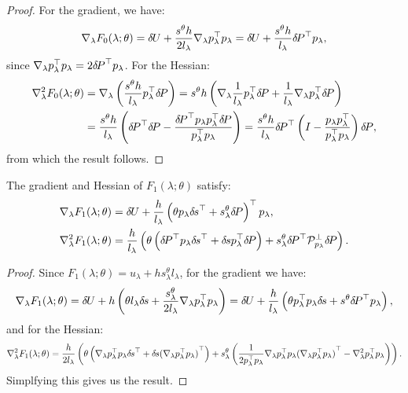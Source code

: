 \documentclass[eikonal.tex]{subfiles}
\begin{document}
\begin{proof}
  For the gradient, we have:
  \begin{equation*}
    \nabla_\lambda F_0(\lambda; \theta) = {\delta \hspace{-0.09em} U} + \frac{s^{\theta} h}{2 l_\lambda} \nabla_\lambda p_\lambda^\top p_\lambda = {\delta \hspace{-0.09em} U} + \frac{s^{\theta} h}{l_\lambda} {\delta \hspace{-0.14em} P}^\top p_\lambda,
  \end{equation*}
  since
  $\nabla_\lambda p_\lambda^\top p_\lambda = 2 {\delta \hspace{-0.14em} P}^\top
  p_\lambda$. For the Hessian:
  \begin{align*}
    \nabla^2_\lambda F_0(\lambda; \theta) &= \nabla_\lambda \left(\frac{s^{\theta} h}{l_\lambda} p_\lambda^\top {\delta \hspace{-0.14em} P}\right) = s^{\theta} h \left(\nabla_\lambda \frac{1}{l_\lambda} p_\lambda^\top {\delta \hspace{-0.14em} P} + \frac{1}{l_\lambda} \nabla_\lambda p_\lambda^\top {\delta \hspace{-0.14em} P}\right) \\
    &= \frac{s^{\theta} h}{l_\lambda} \left({\delta \hspace{-0.14em} P}^\top {\delta \hspace{-0.14em} P} - \frac{{\delta \hspace{-0.14em} P}^\top p_\lambda p_\lambda^\top {\delta \hspace{-0.14em} P}}{p_\lambda^\top p_\lambda}\right) = \frac{s^{\theta} h}{l_\lambda} {\delta \hspace{-0.14em} P}^\top \left(I - \frac{p_\lambda p_\lambda^\top}{p_\lambda^\top p_\lambda}\right) {\delta \hspace{-0.14em} P},
  \end{align*}
  from which the result follows.
\end{proof}

\begin{lemma}\label{prop:F1-grad-and-Hess}
  The gradient and Hessian of $F_1(\lambda; \theta)$ satisfy:
  \begin{align}
    \nabla_\lambda F_1(\lambda; \theta) &= {\delta \hspace{-0.09em} U} + \frac{h}{l_\lambda} \left(\theta p_\lambda {\delta \hspace{-0.1em} s}^\top + s^{\theta}_\lambda {\delta \hspace{-0.14em} P}\right)^\top p_\lambda, \\
    \nabla_\lambda^2 F_1(\lambda; \theta) &= \frac{h}{l_\lambda} \left(\theta \left({\delta \hspace{-0.14em} P}^\top p_\lambda {\delta \hspace{-0.1em} s}^\top + {\delta \hspace{-0.1em} s} p_\lambda^\top {\delta \hspace{-0.14em} P}\right) + s^{\theta}_\lambda {\delta \hspace{-0.14em} P}^\top \mathcal{P}^\perp_{p_\lambda} {\delta \hspace{-0.14em} P}\right). \label{eq:hess-F1}
  \end{align}
\end{lemma}

\begin{proof}
  Since $F_1(\lambda; \theta) = u_\lambda + h s^{\theta}_\lambda l_\lambda$, for the gradient we have:
  \begin{equation*}
    \nabla_\lambda F_1(\lambda; \theta) = {\delta \hspace{-0.09em} U} + h \left(\theta l_\lambda {\delta \hspace{-0.1em} s} + \frac{s^{\theta}_\lambda}{2l_\lambda} \nabla_\lambda p_\lambda^\top p_\lambda\right) = {\delta \hspace{-0.09em} U} + \frac{h}{l_\lambda} \left(\theta p_\lambda^\top p_\lambda {\delta \hspace{-0.1em} s} + s^{\theta} {\delta \hspace{-0.14em} P}^\top p_\lambda\right),
  \end{equation*}
  and for the Hessian:
  \begin{equation*}
    \nabla_\lambda^2 F_1(\lambda; \theta) = \frac{h}{2 l_\lambda} \left(\theta \left(\nabla_\lambda p_\lambda^\top p_\lambda {\delta \hspace{-0.1em} s}^\top + {\delta \hspace{-0.1em} s} {(\nabla_\lambda p_\lambda^\top p_\lambda)}^\top\right) + s^{\theta}_\lambda \left(\frac{1}{2 p_\lambda^\top p_\lambda} \nabla_\lambda p_\lambda^\top p_\lambda {(\nabla_\lambda p_\lambda^\top p_\lambda)}^\top - \nabla^2_\lambda p_\lambda^\top p_\lambda\right)\right).
  \end{equation*}
  Simplfying this gives us the result.
\end{proof}
\end{document}

